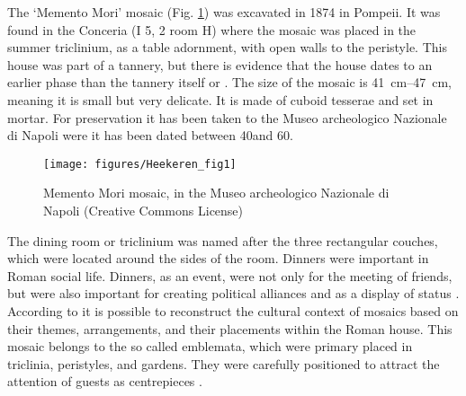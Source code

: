 	The ‘Memento Mori’ mosaic (Fig. \ref {fig:heekeren_fig1}) was excavated in 1874 in Pompeii. It was found in the Conceria (I 5, 2 room H) where the mosaic was placed in the summer triclinium, as a table adornment, with open walls to the peristyle. This house was part of a tannery, but there is evidence that the house dates to an earlier phase than the tannery itself \parencite[185]{Baldassarreal_1990} or \parencite[273]{Mau_1874}. The size of the mosaic is \SIrange{41}{47}{\centi\meter}, meaning it is small but very delicate. 
It is made of cuboid tesserae and set in mortar. 
For preservation it has been taken to the Museo archeologico Nazionale di Napoli were it has been dated between 40\AD and 60\AD  \parencite[9]{Sogliano_1874}.
\begin{figure}[!p]
\centering
\texttt{[image: figures/Heekeren\_fig1]}
\caption{Memento Mori mosaic, in the Museo archeologico Nazionale di Napoli (Creative Commons License)}
\label{fig:heekeren_fig1}
\end{figure}
	The dining room or triclinium was named after the three rectangular couches, which were located around the sides of the room. 
Dinners were important in Roman social life. Dinners, as an event, were not only for the meeting of friends, but were also important for creating political alliances and as a display of status \parencite [119] {Ellis_1991}. According to \textcite [105--106]{Kondoleon_1991} it is possible to reconstruct the cultural context of mosaics based on their themes, 
arrangements, and their placements within the Roman house. 
This mosaic belongs to the so called emblemata, which were primary placed in triclinia, peristyles, and gardens. 
They were carefully positioned to attract the attention of guests as centrepieces \parencite[97]{Stewart_2004}.

